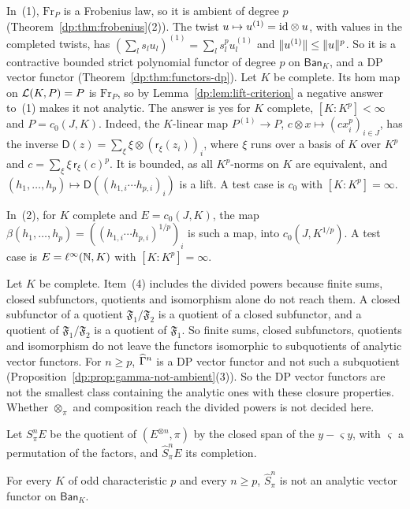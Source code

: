 In~(1), $\mathrm{Fr}_P$ is a Frobenius law, so it is ambient of degree $p$ (Theorem~\ref{dp:thm:frobenius}(2)). The twist $u\mapsto u^{(1)}=\mathrm{id}\otimes u$, with values in the completed twists, has $(\sum_ls_lu_l)^{(1)}=\sum_ls_l^pu_l^{(1)}$ and $\lVert u^{(1)}\rVert\le\lVert u\rVert^p$. So it is a contractive bounded strict polynomial functor of degree $p$ on $\mathsf{Ban}_K$, and a DP vector functor (Theorem~\ref{dp:thm:functors-dp}). Let $K$ be complete. Its hom map on $\mathcal L(K,P)=P$ is $\mathrm{Fr}_P$, so by Lemma~\ref{dp:lem:lift-criterion} a negative answer to~(1) makes it not analytic. The answer is yes for $K$ complete, $[K:K^p]<\infty$ and $P=c_0(J,K)$. Indeed, the $K$-linear map $P^{(1)}\to P$, $c\otimes x\mapsto(cx_i^p)_{i\in J}$, has the inverse $\mathsf D(z)=\sum_\xi\xi\otimes(\mathsf r_\xi(z_i))_i$, where $\xi$ runs over a basis of $K$ over $K^p$ and $c=\sum_\xi\xi\,\mathsf r_\xi(c)^p$. It is bounded, as all $K^p$-norms on $K$ are equivalent, and $(h_1,\dots,h_p)\mapsto\mathsf D((h_{1,i}\cdots h_{p,i})_i)$ is a lift. A test case is $c_0$ with $[K:K^p]=\infty$.

In~(2), for $K$ complete and $E=c_0(J,K)$, the map $\beta(h_1,\dots,h_p)=((h_{1,i}\cdots h_{p,i})^{1/p})_i$ is such a map, into $c_0(J,K^{1/p})$. A test case is $E=\ell^\infty(\mathbb N,K)$ with $[K:K^p]=\infty$.

Let $K$ be complete. Item~(4) includes the divided powers because finite sums, closed subfunctors, quotients and isomorphism alone do not reach them. A closed subfunctor of a quotient $\mathfrak F_1/\mathfrak F_2$ is a quotient of a closed subfunctor, and a quotient of $\mathfrak F_1/\mathfrak F_2$ is a quotient of $\mathfrak F_1$. So finite sums, closed subfunctors, quotients and isomorphism do not leave the functors isomorphic to subquotients of analytic vector functors. For $n\ge p$, $\widehat\Gamma^n$ is a DP vector functor and not such a subquotient (Proposition~\ref{dp:prop:gamma-not-ambient}(3)). So the DP vector functors are not the smallest class containing the analytic ones with these closure properties. Whether $\otimes_\pi$ and composition reach the divided powers is not decided here.

Let $S^n_\pi E$ be the quotient of $(E^{\otimes n},\pi)$ by the closed span of the $y-\varsigma y$, with $\varsigma$ a permutation of the factors, and $\widehat S^n_\pi E$ its completion.

\begin{conjecture}\label{dp:conj:symmetric}
For every $K$ of odd characteristic $p$ and every $n\ge p$, $\widehat S^n_\pi$ is not an analytic vector functor on $\mathsf{Ban}_K$.
\end{conjecture}

